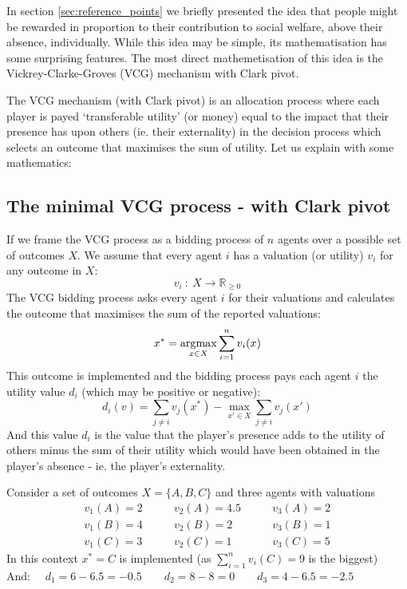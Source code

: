 In section \ref{sec:reference_points} we briefly presented the idea that people might be rewarded in proportion to their contribution to social welfare, above their absence, individually.
While this idea may be simple, its mathematisation has some surprising features.
The most direct mathemetisation of this idea is the Vickrey-Clarke-Groves (VCG) mechanism with Clark pivot.

The VCG mechanism (with Clark pivot) is an allocation process where each player is payed `transferable utility' (or money) equal to the impact that their presence has upon others (ie. their externality) in the decision process which selects an outcome that maximises the sum of utility.
Let us explain with some mathematics:

\subsection{The minimal VCG process - with Clark pivot}
If we frame the VCG process as a bidding process of $n$ agents over a possible set of outcomes $X$.
We assume that every agent $i$ has a valuation (or utility) $v_i$ for any outcome in $X$:
$$ v_i~:~X\rightarrow \mathbb{R}_{\ge 0} $$
The VCG bidding process asks every agent $i$ for their valuations and calculates the outcome that maximises the sum of the reported valuations:
$$ x^* = \operatorname*{\arg\!\max}_{x\in X}\sum_{i=1}^{n}v_i(x) $$
This outcome is implemented and the bidding process pays each agent $i$ the utility value $d_i$ (which may be positive or negative):
\begin{equation}\label{eq:VCG_payment_rule} d_i(v)=\sum_{j\ne i}v_j(x^*) - \max_{x'\in X}\sum_{j\ne i}v_j(x') \end{equation}
And this value $d_i$ is the value that the player's presence adds to the utility of others minus the sum of their utility which would have been obtained in the player's absence - ie. the player's externality.

\begin{example}
Consider a set of outcomes $X = \{A,B,C\}$ and three agents with valuations 
$$\begin{matrix}v_1(A) = 2\\v_1(B) = 4\\v_1(C) = 3\end{matrix}\quad\quad
\begin{matrix}v_2(A) = 4.5\\v_2(B) = 2\\v_2(C) = 1\end{matrix}\quad\quad
\begin{matrix}v_3(A) = 2\\v_3(B) = 1\\v_3(C) = 5\end{matrix}$$
In this context $x^* = C$ is implemented (as $\sum_{i=1}^nv_i(C)=9$ is the biggest)\\And:
$\quad d_1 = 6-6.5 = -0.5 \quad\quad d_2 = 8-8 = 0\quad\quad d_3 = 4-6.5 = -2.5 $
\end{example}

